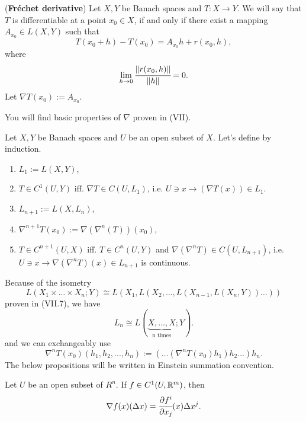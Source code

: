 \documentclass[main.tex]{subfiles}
\begin{document}
\begin{definition} (\textbf{Fréchet derivative})
Let $X, Y$ be Banach spaces and $T:X\to Y$. We will say that $T$ is differentiable at a point $x_0\in X$, if and only if there exist a mapping $A_{x_0}\in L(X,Y)$ such that
\begin{equation}
    T(x_0 + h) - T(x_0) = A_{x_0}h + r(x_0, h),
\end{equation}
where
\begin{equation}
    \lim_{h\to 0} \cfrac{\norm{r(x_0, h)}}{\norm{h}} = 0.
\end{equation}
Let $\nabla T(x_0) := A_{x_0}$.
\end{definition}
You will find basic properties of $\nabla$ proven in \cite{maurin1976} (VII).
\begin{definition}
Let $X, Y$ be Banach spaces and $U$ be an open subset of $X$. Let's define by induction.
\begin{enumerate}
\item
$L_1 := L(X, Y)$,
\item
$T\in C^1(U, Y)$ iff. $\nabla T\in C(U, L_1)$, i.e. $U\ni x\to (\nabla T(x))\in L_1$.
\item
$L_{n + 1} := L(X, L_n)$,
\item
$\nabla^{n+1} T(x_0) := \nabla(\nabla^{n}(T))(x_0)$,
\item
$T\in C^{n+1}(U, X)$ iff. $T\in C^n(U, Y)$ and $\nabla(\nabla^n T)\in C(U, L_{n+1})$, i.e. $U\ni x \to \nabla(\nabla^n T)(x)\in L_{n+1}$ is continuous.
\end{enumerate}
\end{definition}

Because of the isometry
\begin{equation}
    L(X_1 \times \dots \times X_n; Y) \cong L(X_1, L(X_2, \dots, L(X_{n-1}, L(X_n, Y))\dots ))
\end{equation}
proven in \cite{maurin1976} (VII.7), we have
\begin{equation}
    L_n \cong L(\underbrace{X, \dots, X}_\text{n times}; Y).
\end{equation}
and we can exchangeably use
\begin{equation}
    \nabla^n T(x_0)(h_1, h_2, ..., h_n):= (\dots(\nabla^nT(x_0)h_1)h_2\dots )h_n. 
\end{equation}
The below propositions will be written in Einstein summation convention.
\begin{proposition}
Let $U$ be an open subset of $R^n$. If $f\in C^1(U, \mathbb{R}^m)$, then
\begin{equation}
    \nabla f (x)(\Delta x) = \cfrac{\partial f^i}{\partial x_j}(x)\Delta x^j.
\end{equation}

\end{proposition}
\end{document}
